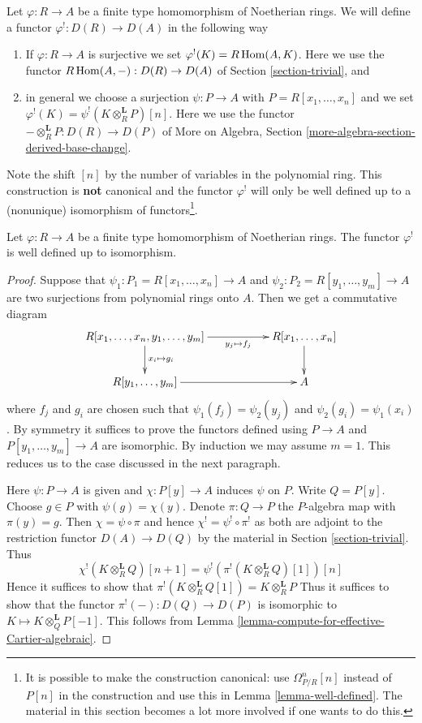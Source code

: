 \medskip\noindent
Let $\varphi : R \to A$ be a finite type homomorphism of Noetherian rings.
We will define a functor $\varphi^! : D(R) \to D(A)$ in the following way
\begin{enumerate}
\item If $\varphi : R \to A$ is surjective we set
$\varphi^!(K) = R\mathop{\mathrm{Hom}}\nolimits(A, K)$. Here we use the functor
$R\mathop{\mathrm{Hom}}\nolimits(A, -) : D(R) \to D(A)$ of
Section \ref{section-trivial}, and
\item in general we choose a surjection $\psi : P \to A$ with
$P = R[x_1, \ldots, x_n]$ and we set
$\varphi^!(K) = \psi^!(K \otimes_R^\mathbf{L} P)[n]$.
Here we use the functor
$- \otimes_R^\mathbf{L} P : D(R) \to D(P)$
of More on Algebra, Section \ref{more-algebra-section-derived-base-change}.
\end{enumerate}
Note the shift $[n]$ by the number of variables in the polynomial
ring. This construction is {\bf not} canonical and the functor
$\varphi^!$ will only be well defined up to a (nonunique) isomorphism of
functors\footnote{It is possible to make the construction canonical:
use $\Omega^n_{P/R}[n]$ instead of $P[n]$ in the
construction and use this in Lemma \ref{lemma-well-defined}.
The material in this section becomes a lot more involved
if one wants to do this.}.

\begin{lemma}
\label{lemma-well-defined}
Let $\varphi : R \to A$ be a finite type homomorphism of
Noetherian rings. The functor $\varphi^!$ is well defined
up to isomorphism.
\end{lemma}

\begin{proof}
Suppose that $\psi_1 : P_1 = R[x_1, \ldots, x_n] \to A$ and
$\psi_2 : P_2 = R[y_1, \ldots, y_m] \to A$ are two
surjections from polynomial rings onto $A$. Then we get a
commutative diagram
$$
\xymatrix{
R[x_1, \ldots, x_n, y_1, \ldots, y_m]
\ar[d]^{x_i \mapsto g_i} \ar[rr]_-{y_j \mapsto f_j} & &
R[x_1, \ldots, x_n] \ar[d] \\
R[y_1, \ldots, y_m] \ar[rr] & & A
}
$$
where $f_j$ and $g_i$ are chosen such that $\psi_1(f_j) = \psi_2(y_j)$
and $\psi_2(g_i) = \psi_1(x_i)$. By symmetry it suffices to prove
the functors defined using $P \to A$ and $P[y_1, \ldots, y_m] \to A$
are isomorphic. By induction we may assume $m = 1$. This reduces
us to the case discussed in the next paragraph.

\medskip\noindent
Here $\psi : P \to A$ is given and $\chi : P[y] \to A$ induces
$\psi$ on $P$. Write $Q = P[y]$.
Choose $g \in P$ with $\psi(g) = \chi(y)$.
Denote $\pi : Q \to P$ the $P$-algebra map
with $\pi(y) = g$. Then $\chi = \psi \circ \pi$ and hence
$\chi^! = \psi^! \circ \pi^!$ as both are
adjoint to the restriction functor $D(A) \to D(Q)$ by the material
in Section \ref{section-trivial}. Thus
$$
\chi^!\left(K \otimes_R^\mathbf{L} Q\right)[n + 1] =
\psi^!\left(\pi^!\left(K \otimes_R^\mathbf{L} Q\right)[1]\right)[n]
$$
Hence it suffices to show that
$\pi^!(K \otimes_R^\mathbf{L} Q[1]) = K \otimes_R^\mathbf{L} P$
Thus it suffices to show that the functor
$\pi^!(-) : D(Q) \to D(P)$
is isomorphic to $K \mapsto K \otimes_Q^\mathbf{L} P[-1]$.
This follows from Lemma \ref{lemma-compute-for-effective-Cartier-algebraic}.
\end{proof}

